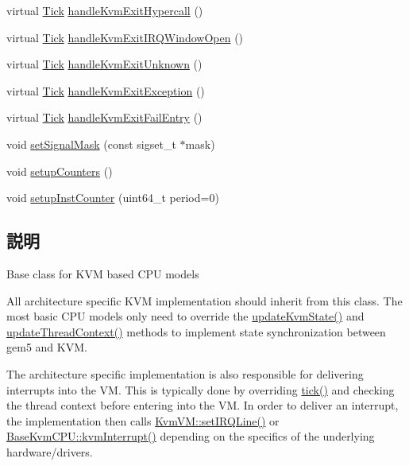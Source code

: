 \begin{DoxyCompactItemize}
\item 
virtual \hyperlink{base_2types_8hh_a5c8ed81b7d238c9083e1037ba6d61643}{Tick} \hyperlink{classBaseKvmCPU_a32523a85b6259326f71aea298ae96ff6}{handleKvmExitHypercall} ()
\item 
virtual \hyperlink{base_2types_8hh_a5c8ed81b7d238c9083e1037ba6d61643}{Tick} \hyperlink{classBaseKvmCPU_a405e34c9d079e8823ac2a1ca0e816a47}{handleKvmExitIRQWindowOpen} ()
\item 
virtual \hyperlink{base_2types_8hh_a5c8ed81b7d238c9083e1037ba6d61643}{Tick} \hyperlink{classBaseKvmCPU_a00e63a4b01cf730bba2c42ef852b0876}{handleKvmExitUnknown} ()
\item 
virtual \hyperlink{base_2types_8hh_a5c8ed81b7d238c9083e1037ba6d61643}{Tick} \hyperlink{classBaseKvmCPU_a9e36bfbe1df222d0ceeaa2f83ad8fa2b}{handleKvmExitException} ()
\item 
virtual \hyperlink{base_2types_8hh_a5c8ed81b7d238c9083e1037ba6d61643}{Tick} \hyperlink{classBaseKvmCPU_a0dfcd253bad58e13a071f638d6638b1e}{handleKvmExitFailEntry} ()
\item 
void \hyperlink{classBaseKvmCPU_a76bff52136628a5be57e6d1ea8ff5370}{setSignalMask} (const sigset\_\-t $\ast$mask)
\item 
void \hyperlink{classBaseKvmCPU_a9a2709df130ee7a63e53f9d65a0ebb36}{setupCounters} ()
\item 
void \hyperlink{classBaseKvmCPU_a807cad1db3257b823ffdb698c1e62a9a}{setupInstCounter} (uint64\_\-t period=0)
\end{DoxyCompactItemize}


\subsection{説明}
Base class for KVM based CPU models

All architecture specific KVM implementation should inherit from this class. The most basic CPU models only need to override the \hyperlink{classBaseKvmCPU_a48817be7bf03ef44cc5114ecf4df9b27}{updateKvmState()} and \hyperlink{classBaseKvmCPU_ac47bfb587580ca76050e0c9bc753c10d}{updateThreadContext()} methods to implement state synchronization between gem5 and KVM.

The architecture specific implementation is also responsible for delivering interrupts into the VM. This is typically done by overriding \hyperlink{classBaseKvmCPU_a873dd91783f9efb4a590aded1f70d6b0}{tick()} and checking the thread context before entering into the VM. In order to deliver an interrupt, the implementation then calls \hyperlink{group__KvmInterrupts_ga5037b917c47fff611ecdd5b547655284}{KvmVM::setIRQLine()} or \hyperlink{group__KvmInterrupts_ga16b8f95e3f70098952604e6b8a121679}{BaseKvmCPU::kvmInterrupt()} depending on the specifics of the underlying hardware/drivers. 

